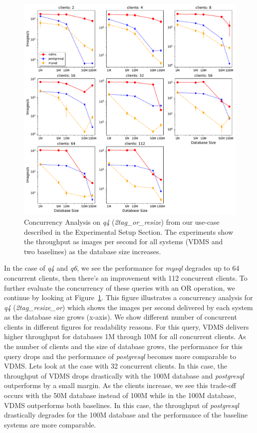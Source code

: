\begin{figure}[ht]
\includegraphics[width=\columnwidth]{figures/plot_q_2tag_resize_or_mosaic_results_throughput_threads}
\caption{Concurrency Analysis on \textit{q4} (\textit{2tag\_or\_resize}) from our use-case
described in the Experimental Setup Section.
The experiments show the throughput as images per second for
all systems (VDMS and two baselines) as the database size increases.}
\label{fig:concurrency_comparison_q4}
\end{figure}

In the case of \textit{q4} and \textit{q6}, we see the performance for \textit{mysql}
degrades up to 64 concurrent clients, then there's an improvement with 112 concurrent clients.
To further evaluate the concurrency of these queries with an OR operation, we continue by
looking at Figure~\ref{fig:concurrency_comparison_q4}. This figure illustrates a concurrency analysis for
\textit{q4} (\textit{2tag\_resize\_or}) which shows the images per second
delivered by each system as the database size grows (x-axis). We show different number
of concurrent clients in different figures for readability reasons.  For this query,
VDMS delivers higher throughput for databases 1M through 10M for all concurrent clients.
As the number of clients and the size of database grows, the performance for this query
drops and the performance of \textit{postgresql} becomes more comparable to VDMS. Lets look at the
case with 32 concurrent clients.
In this case, the throughput of VDMS drops drastically with
the 100M database and \textit{postgresql} outperforms by a small margin.
As the clients increase, we see this trade-off occurs with the 50M database
instead of 100M while in the 100M database, VDMS outperforms both baselines.
In this case, the throughput of \textit{postgresql} drastically degrades
for the 100M database and the performance of the baseline systems are more comparable.

